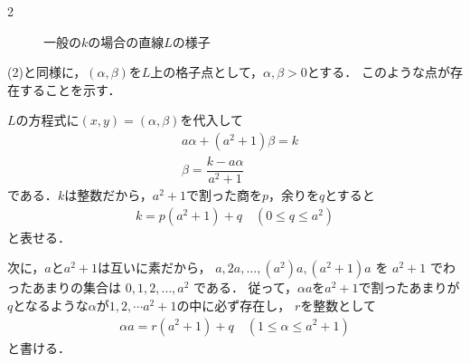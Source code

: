 \documentclass[../../main.tex]{subfiles}
\begin{document}
\begin{multicols}{2}
\begin{figure}[H]
    \caption{一般の$k$の場合の直線$L$の様子}
    \label{2000-3:fig:2}
  \end{figure}
  (2)と同様に，$(\alpha, \beta)$を$L$上の格子点として，$\alpha,\beta>0$とする．
  このような点が存在することを示す．

  $L$の方程式に$(x,y)=(\alpha, \beta)$を代入して
  \begin{align}
    & a\alpha + (a^2+1)\beta  = k                         \\
    & \beta = \dfrac{k-a\alpha}{a^2+1} \label{eq:1}
  \end{align}
  である．$k$は整数だから，$a^2+1$で割った商を$p$，余りを$q$とすると
  \begin{align}
    k = p(a^2+1) + q \quad (0 \leq q \le a^2) \label{eq:2}
  \end{align}
  と表せる．

  次に，$a$と$a^2+1$は互いに素だから，
  $a, 2a, \dots, (a^2)a, (a^2+1)a$ を $a^2+1$ でわったあまりの集合は $0, 1, 2, \dots, a^2$ である．
  従って，$\alpha a$を$a^2+1$で割ったあまりが$q$となるような$\alpha$が$1,2,\cdots a^2+1$の中に必ず存在し，
  $r$を整数として
  \begin{align}
    \alpha a = r(a^2+1) + q \quad (1 \le \alpha \le a^2+1) \label{eq:3}
  \end{align}
  と書ける．


\end{multicols}
\end{document}
